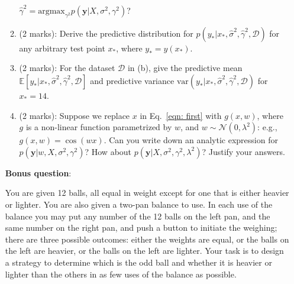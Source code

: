 \documentclass[11pt]{article}
\newcommand{\mbf}[1]{{\boldsymbol{\mathbf{#1}}}}
\renewcommand{\bm}{\mbf}
\begin{document}
\begin{enumerate}
\begin{enumerate}[label=(\alph*)]
$\hat{\gamma}^2 =  \text{argmax}_{\gamma^2} p(\bm{y} | X, \sigma^2, \gamma^2)$?
\item (2 marks): Derive the predictive distribution for $p( y_* | {x}_*, \hat{\sigma}^2, \hat{\gamma}^2, \mathcal{D})$ for any arbitrary test point $x_*$,
where $y_* = y(x_*)$.
\item (2 marks): For the dataset $\mathcal{D}$ in (b), give the predictive mean $\mathbb{E}[y_* | x_*, \hat{\sigma}^2, \hat{\gamma}^2, \mathcal{D}]$ and predictive variance $\text{var}(y_* |  x_*, \hat{\sigma}^2, \hat{\gamma}^2, \mathcal{D})$ for $x_* = 14$.
\item (2 marks): Suppose we replace $x$ in Eq.~\eqref{eqn: first} with $g(x,w)$, where $g$ is a non-linear function parametrized by $w$,
and $w \sim \mathcal{N}(0,\lambda^2)$: e.g., $g(x,w) = \cos (w x)$.  Can you write down an analytic expression for $p(\bm{y} | w, X, \sigma^2, \gamma^2)$?  How about $p(\bm{y} | X, \sigma^2, \gamma^2, \lambda^2)$?  Justify your answers.

\end{enumerate}
\vspace{5mm}
\textbf{Bonus question}:



You are given 12 balls, all equal in weight except for one that is either heavier or lighter. You are
also given a two-pan balance to use. In each use of the balance you may put any number of the
12 balls on the left pan, and the same number on the right pan, and push a button to initiate
the weighing; there are three possible outcomes: either the weights are equal, or the balls on the
left are heavier, or the balls on the left are lighter. Your task is to design a strategy to determine
which is the odd ball and whether it is heavier or lighter than the others in as few uses of the
balance as possible.

\end{enumerate}
\end{document}
